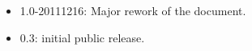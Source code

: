 \documentclass[11pt,notitlepage,onecolumn]{ivoa}
\begin{document}
\begin{itemize}
\begin{itemize}
	\end{itemize}
\item 1.0-20111216: Major rework of the document.
\item 0.3: initial public release.
\end{itemize}

\clearpage


\end{document}
